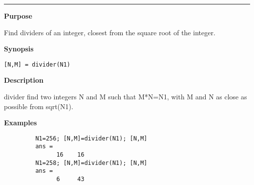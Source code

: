


\hspace*{-1.6cm}{\Large \bf divider}

\vspace*{-.4cm}
\hspace*{-1.6cm}\rule[0in]{16.5cm}{.02cm}
\vspace*{.2cm}



{\bf \large {}\selectfont Purpose}\\
\hspace*{1.5cm}
\begin{minipage}[t]{13.5cm}
Find dividers of an integer, closest from the square root of the integer.
\end{minipage}
\vspace*{.5cm}


{\bf \large {}\selectfont Synopsis}\\
\hspace*{1.5cm}
\begin{minipage}[t]{13.5cm}
\begin{verbatim}
[N,M] = divider(N1)
\end{verbatim}
\end{minipage}
\vspace*{.5cm}


{\bf \large {}\selectfont Description}\\
\hspace*{1.5cm}
\begin{minipage}[t]{13.5cm}
        {\ty divider} find two integers {\ty N} and {\ty M} such that {\ty
        M*N=N1}, with {\ty M} and {\ty N} as close as possible from {\ty
        sqrt(N1)}.\\
\end{minipage}
\vspace*{.5cm}


{\bf \large {}\selectfont Examples}
\begin{verbatim}
         N1=256; [N,M]=divider(N1); [N,M]
         ans = 
               16    16 
         N1=258; [N,M]=divider(N1); [N,M]
         ans = 
               6     43 
\end{verbatim}



